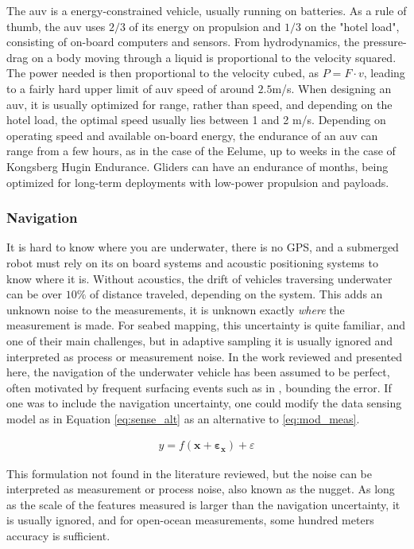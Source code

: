 The \acrshort{auv} is a energy-constrained vehicle, usually running on batteries. As a rule of thumb, the \acrshort{auv} uses $2/3$ of its energy on propulsion and $1/3$ on the "hotel load", consisting of on-board computers and sensors. From hydrodynamics, the pressure-drag on a body moving through a liquid is proportional to the velocity squared. The power needed is then proportional to the velocity cubed, as $P=F\cdot v$, leading to a fairly hard upper limit of \acrshort{auv} speed of around $2.5$m/s. When designing an \acrshort{auv}, it is usually optimized for range, rather than speed, and depending on the hotel load, the optimal speed usually lies between 1 and 2 m/s. Depending on operating speed and available on-board energy, the endurance of an \acrshort{auv} can range from a few hours, as in the case of the Eelume, up to weeks in the case of Kongsberg Hugin Endurance. Gliders can have an endurance of months, being optimized for long-term deployments with low-power propulsion and payloads. 

\subsubsection*{Navigation}

It is hard to know where you are underwater, there is no GPS, and a submerged robot must rely on its on board systems and acoustic positioning systems to know where it is. Without acoustics, the drift of vehicles traversing underwater can be over $10\%$ of distance traveled, depending on the system. This adds an unknown noise to the measurements, it is unknown exactly \textit{where} the measurement is made. For seabed mapping, this uncertainty is quite familiar, and one of their main challenges, but in adaptive sampling it is usually ignored and interpreted as process or measurement noise. In the work reviewed and presented here, the navigation of the underwater vehicle has been assumed to be perfect, often motivated by frequent surfacing events such as in \textcite{fossum2021adaptive}, bounding the error. If one was to include the navigation uncertainty, one could modify the data sensing model as in Equation \eqref{eq:sense_alt} as an alternative to \eqref{eq:mod_meas}. 

\begin{align}
    \label{eq:sense_alt}
    y = f(\mathbf{x}+\mathbf{\varepsilon_x}) + \varepsilon
\end{align}

This formulation not found in the literature reviewed, but the noise can be interpreted as measurement or process noise, also known as the nugget. As long as the scale of the features measured is larger than the navigation uncertainty, it is usually ignored, and for open-ocean measurements, some hundred meters accuracy is sufficient. 


